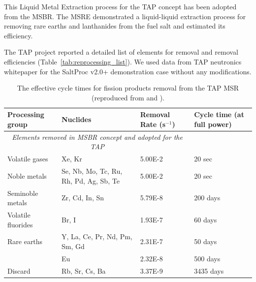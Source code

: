 \documentclass[12pt]{article} %
\begin{document}
This Liquid Metal Extraction process for the \gls{TAP} concept has been 
adopted from the \gls{MSBR}. The \gls{MSRE} demonstrated a liquid-liquid 
extraction process for removing rare earths and lanthanides from the fuel salt 
and estimated its efficiency.

The \gls{TAP} project reported a detailed list of elements for removal and 
removal efficiencies (Table~\ref{tab:reprocessing_list}). We used data from 
\gls{TAP} neutronics 
whitepaper\cite{transatomic_power_corporation_neutronics_2016} for the 
SaltProc v2.0+  demonstration case without any modifications.
\begin{table}[ht!]
        \centering
        \caption{The effective cycle times for fission products removal from 
        the \gls{TAP} \gls{MSR} (reproduced from 
        \cite{betzler_implementation_2017} and 
        \cite{transatomic_power_corporation_neutronics_2016}).}
        \begin{tabular}{p{} p{} p{} p{}}
        \hline 
        Processing group & \qquad\qquad\qquad Nuclides & Removal Rate (s$^{-1}$) & Cycle time (at full power) \\ [5pt] \hline 
 \multicolumn{3}{c}{\textit{Elements removed in \gls{MSBR} concept and adopted for the \gls{TAP}} \cite{robertson_conceptual_1971}} \\
        Volatile gases & Xe, Kr								  & 5.00E-2 & 20 sec \\ [5pt]
        Noble metals & Se, Nb, Mo, Tc, Ru, Rh, Pd, Ag, Sb, Te & 5.00E-2 & 20 sec \\ [5pt]
        Seminoble metals & Zr, Cd, In, Sn	  				  & 5.79E-8 & 200 days \\ [5pt]
        Volatile fluorides & Br, I 							  & 1.93E-7 & 60 days \\ [5pt]
        Rare earths & Y, La, Ce, Pr, Nd, Pm, Sm, Gd           & 2.31E-7 & 50 days \\ [5pt]
        \qquad & Eu & 2.32E-8 & 500 days \\ [5pt]
        Discard & Rb, Sr, Cs, Ba & 3.37E-9 & 3435 days \\ [5pt] 
        \hline
 

\end{tabular}
\end{table}
\end{document}
